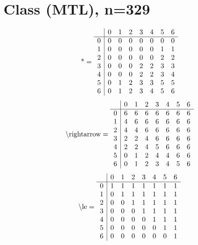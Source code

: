 \documentclass[11pt]{article}
\begin{document}
\section{Class (MTL), n=329}
\[\text{*} = 
\begin{array}{r | r r r r r r r}
 & 0 & 1 & 2 & 3 & 4 & 5 & 6 \\ \hline
0 & 0 & 0 & 0 & 0 & 0 & 0 & 0 \\
1 & 0 & 0 & 0 & 0 & 0 & 1 & 1 \\
2 & 0 & 0 & 0 & 0 & 0 & 2 & 2 \\
3 & 0 & 0 & 0 & 2 & 2 & 3 & 3 \\
4 & 0 & 0 & 0 & 2 & 2 & 3 & 4 \\
5 & 0 & 1 & 2 & 3 & 3 & 5 & 5 \\
6 & 0 & 1 & 2 & 3 & 4 & 5 & 6 \\
\end{array}
\]
\[\text{\textbackslash rightarrow} = 
\begin{array}{r | r r r r r r r}
 & 0 & 1 & 2 & 3 & 4 & 5 & 6 \\ \hline
0 & 6 & 6 & 6 & 6 & 6 & 6 & 6 \\
1 & 4 & 6 & 6 & 6 & 6 & 6 & 6 \\
2 & 4 & 4 & 6 & 6 & 6 & 6 & 6 \\
3 & 2 & 2 & 4 & 6 & 6 & 6 & 6 \\
4 & 2 & 2 & 4 & 5 & 6 & 6 & 6 \\
5 & 0 & 1 & 2 & 4 & 4 & 6 & 6 \\
6 & 0 & 1 & 2 & 3 & 4 & 5 & 6 \\
\end{array}
\]
\[\text{\textbackslash le} = 
\begin{array}{r | r r r r r r r}
 & 0 & 1 & 2 & 3 & 4 & 5 & 6 \\ \hline
0 & 1 & 1 & 1 & 1 & 1 & 1 & 1 \\
1 & 0 & 1 & 1 & 1 & 1 & 1 & 1 \\
2 & 0 & 0 & 1 & 1 & 1 & 1 & 1 \\
3 & 0 & 0 & 0 & 1 & 1 & 1 & 1 \\
4 & 0 & 0 & 0 & 0 & 1 & 1 & 1 \\
5 & 0 & 0 & 0 & 0 & 0 & 1 & 1 \\
6 & 0 & 0 & 0 & 0 & 0 & 0 & 1 \\
\end{array}
\]
\end{document}
